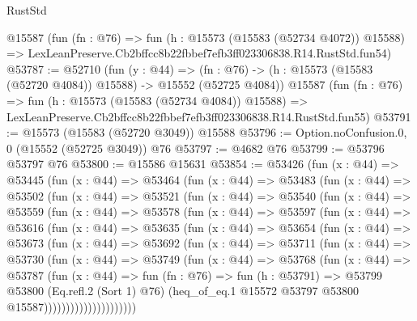 \begin{lexlean}{RustStd}
\begin{coremodule}
    @15587
    (fun (fn : @76) =>
    fun (h : @15573 (@15583 (@52734 @4072)) @15588) =>
    LexLeanPreserve.Cb2bffcc8b22fbbef7efb3ff023306838.R14.RustStd.fun54)
@53787 := @52710
    (fun (y : @44) =>
    (fn : @76) -> (h : @15573 (@15583 (@52720 @4084)) @15588) -> @15552 (@52725 @4084))
    @15587
    (fun (fn : @76) =>
    fun (h : @15573 (@15583 (@52734 @4084)) @15588) =>
    LexLeanPreserve.Cb2bffcc8b22fbbef7efb3ff023306838.R14.RustStd.fun55)
@53791 := @15573 (@15583 (@52720 @3049)) @15588
@53796 := Option.noConfusion.{0, 0} (@15552 (@52725 @3049)) @76
@53797 := @4682 @76
@53799 := @53796 @53797 @76
@53800 := @15586 @15631
@53854 := @53426
    (fun (x : @44) =>
    @53445
      (fun (x : @44) =>
      @53464
        (fun (x : @44) =>
        @53483
          (fun (x : @44) =>
          @53502
            (fun (x : @44) =>
            @53521
              (fun (x : @44) =>
              @53540
                (fun (x : @44) =>
                @53559
                  (fun (x : @44) =>
                  @53578
                    (fun (x : @44) =>
                    @53597
                      (fun (x : @44) =>
                      @53616
                        (fun (x : @44) =>
                        @53635
                          (fun (x : @44) =>
                          @53654
                            (fun (x : @44) =>
                            @53673
                              (fun (x : @44) =>
                              @53692
                                (fun (x : @44) =>
                                @53711
                                  (fun (x : @44) =>
                                  @53730
                                    (fun (x : @44) =>
                                    @53749
                                      (fun (x : @44) =>
                                      @53768
                                        (fun (x : @44) =>
                                        @53787
                                          (fun (x : @44) =>
                                          fun (fn : @76) =>
                                          fun (h : @53791) =>
                                          @53799
                                            @53800
                                            (Eq.refl.{2} (Sort 1) @76)
                                            (heq_of_eq.{1}
                                              @15572
                                              @53797
                                              @53800
                                              @15587)))))))))))))))))))))

\end{coremodule}
\end{lexlean}
